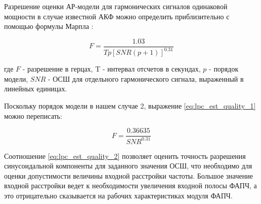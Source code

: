 Разрешение оценки АР-модели для гармонических сигналов одинаковой мощности в случае известной АКФ
можно определить приблизительно с помощью формулы Марпла \cite{marpl_book, kay_ar_book}:
\begin{center}
\begin{equation}
	\label{eq:lpc_est_quality_1}
	F = \frac{1.03}{Tp[SNR(p+1)]^{0.31}}
\end{equation}
\end{center}

где ${F}$ - разрешение в герцах, T - интервал отсчетов в секундах, ${p}$ - порядок модели,
${SNR}$ - ОСШ для отдельного гармонического сигнала, выраженный в линейных единицах.

Поскольку порядок модели в нашем случае 2, выражение \ref{eq:lpc_est_quality_1} можно переписать:
\begin{center}
\begin{equation}
	\label{eq:lpc_est_quality_2}
	F = \frac{0.36635}{SNR^{0.31}}
\end{equation}
\end{center}

Соотношение \ref{eq:lpc_est_quality_2} позволяет оценить точность разрешения синусоидальной компоненты
для заданного значения ОСШ, что необходимо для оценки допустимости величины входной расстройки частоты.
Большое значение входной расстройки ведет к необходимости увеличения входной полосы ФАПЧ, а это
отрицательно сказывается на рабочих характеристиках модуля ФАПЧ.

\newpage
